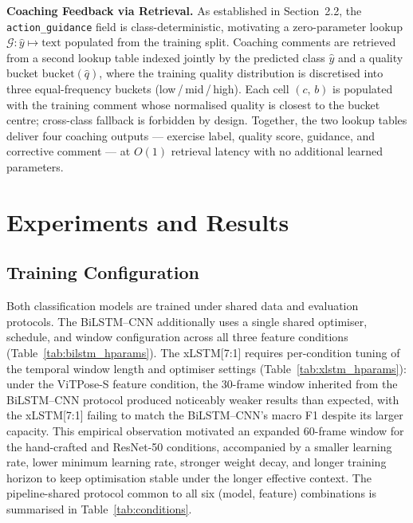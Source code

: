 \documentclass[conference,onecolumn,oneside]{IEEEtran}
\begin{document}
\textbf{Coaching Feedback via Retrieval.}
As established in Section~2.2, the \texttt{action\_guidance} field is
class-deterministic, motivating a zero-parameter lookup
$\mathcal{G}: \hat{y} \mapsto \text{text}$ populated from the
training split. Coaching comments are retrieved from a second
lookup table indexed jointly by the predicted class $\hat{y}$ and a
quality bucket $\mathrm{bucket}(\hat{q})$, where the training
quality distribution is discretised into three equal-frequency buckets
(low\,/\,mid\,/\,high). Each cell $(c,\,b)$ is populated with the
training comment whose normalised quality is closest to the bucket
centre; cross-class fallback is forbidden by design. Together, the
two lookup tables deliver four coaching outputs — exercise label,
quality score, guidance, and corrective comment — at $O(1)$
retrieval latency with no additional learned parameters.

\vspace{0.4cm}
\section{Experiments and Results}
\label{sec:experiments}
\subsection{Training Configuration}
Both classification models are trained under shared data and evaluation
protocols. The BiLSTM--CNN additionally uses a single shared optimiser,
schedule, and window configuration across all three feature conditions
(Table~\ref{tab:bilstm_hparams}). The xLSTM[7:1] requires per-condition
tuning of the temporal window length and optimiser settings
(Table~\ref{tab:xlstm_hparams}): under the ViTPose-S feature condition,
the 30-frame window inherited from the BiLSTM--CNN protocol produced
noticeably weaker results than expected, with the xLSTM[7:1] failing to
match the BiLSTM--CNN's macro F1 despite its larger capacity. This
empirical observation motivated an expanded 60-frame window for the
hand-crafted and ResNet-50 conditions, accompanied by a smaller
learning rate, lower minimum learning rate, stronger weight decay, and
longer training horizon to keep optimisation stable under the longer
effective context.  The pipeline-shared protocol common to all six
(model, feature) combinations is summarised in
Table~\ref{tab:conditions}.
\end{document}
